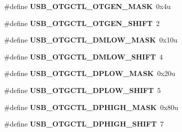 \begin{DoxyCompactItemize}
\item 
\#define {\bfseries U\+S\+B\+\_\+\+O\+T\+G\+C\+T\+L\+\_\+\+O\+T\+G\+E\+N\+\_\+\+M\+A\+SK}~0x4u\hypertarget{group__USB__Register__Masks_ga6cdb9b59615dfc774914e37d44f17e3a}{}\label{group__USB__Register__Masks_ga6cdb9b59615dfc774914e37d44f17e3a}

\item 
\#define {\bfseries U\+S\+B\+\_\+\+O\+T\+G\+C\+T\+L\+\_\+\+O\+T\+G\+E\+N\+\_\+\+S\+H\+I\+FT}~2\hypertarget{group__USB__Register__Masks_ga45ccee22440e024d6e6096d5607372f6}{}\label{group__USB__Register__Masks_ga45ccee22440e024d6e6096d5607372f6}

\item 
\#define {\bfseries U\+S\+B\+\_\+\+O\+T\+G\+C\+T\+L\+\_\+\+D\+M\+L\+O\+W\+\_\+\+M\+A\+SK}~0x10u\hypertarget{group__USB__Register__Masks_ga929467feea7b1506c205dd78112a8a98}{}\label{group__USB__Register__Masks_ga929467feea7b1506c205dd78112a8a98}

\item 
\#define {\bfseries U\+S\+B\+\_\+\+O\+T\+G\+C\+T\+L\+\_\+\+D\+M\+L\+O\+W\+\_\+\+S\+H\+I\+FT}~4\hypertarget{group__USB__Register__Masks_ga11854093d47631b4f11f0c50bf7a063f}{}\label{group__USB__Register__Masks_ga11854093d47631b4f11f0c50bf7a063f}

\item 
\#define {\bfseries U\+S\+B\+\_\+\+O\+T\+G\+C\+T\+L\+\_\+\+D\+P\+L\+O\+W\+\_\+\+M\+A\+SK}~0x20u\hypertarget{group__USB__Register__Masks_gad6a988a0338aa5fcd511f9644b2375eb}{}\label{group__USB__Register__Masks_gad6a988a0338aa5fcd511f9644b2375eb}

\item 
\#define {\bfseries U\+S\+B\+\_\+\+O\+T\+G\+C\+T\+L\+\_\+\+D\+P\+L\+O\+W\+\_\+\+S\+H\+I\+FT}~5\hypertarget{group__USB__Register__Masks_ga94318731712f5399af57fefe46ac8cec}{}\label{group__USB__Register__Masks_ga94318731712f5399af57fefe46ac8cec}

\item 
\#define {\bfseries U\+S\+B\+\_\+\+O\+T\+G\+C\+T\+L\+\_\+\+D\+P\+H\+I\+G\+H\+\_\+\+M\+A\+SK}~0x80u\hypertarget{group__USB__Register__Masks_ga58ba9522df4e9a18c7efa0472837c30c}{}\label{group__USB__Register__Masks_ga58ba9522df4e9a18c7efa0472837c30c}

\item 
\#define {\bfseries U\+S\+B\+\_\+\+O\+T\+G\+C\+T\+L\+\_\+\+D\+P\+H\+I\+G\+H\+\_\+\+S\+H\+I\+FT}~7\hypertarget{group__USB__Register__Masks_ga898efaea515cbbb64826b7685082665f}{}\label{group__USB__Register__Masks_ga898efaea515cbbb64826b7685082665f}


\end{DoxyCompactItemize}
